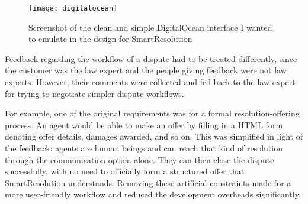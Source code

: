 \begin{figure}[h!]
  \centering
    \ifimages
    \texttt{[image: digitalocean]}
    \fi
  \caption{Screenshot of the clean and simple DigitalOcean interface I wanted to emulate in the design for SmartResolution}
  \label{screenshot:digitalOcean}
\end{figure}

Feedback regarding the workflow of a dispute had to be treated differently, since the customer was the law expert and the people giving feedback were not law experts. However, their comments were collected and fed back to the law expert for trying to negotiate simpler dispute workflows.

For example, one of the original requirements was for a formal resolution-offering process. An agent would be able to make an offer by filling in a HTML form denoting offer details, damages awarded, and so on. This was simplified in light of the feedback: agents are human beings and can reach that kind of resolution through the communication option alone. They can then close the dispute successfully, with no need to officially form a structured offer that SmartResolution understands. Removing these artificial constraints made for a more user-friendly workflow and reduced the development overheads significantly.